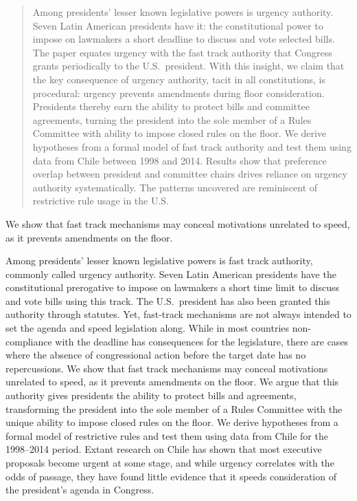 \begin{abstract}
\noindent  Among presidents' lesser known legislative powers is urgency authority. Seven Latin American presidents have it: the constitutional power to impose on lawmakers a short deadline to discuss and vote selected bills. The paper equates urgency with the fast track authority that Congress grants periodically to the U.S.\ president. With this insight, we claim that the key consequence of urgency authority, tacit in all constitutions, is procedural: urgency prevents amendments during floor consideration. Presidents thereby earn the ability to protect bills and committee agreements, turning the president into the sole member of a Rules Committee with ability to impose closed rules on the floor. We derive hypotheses from a formal model of fast track authority and test them using data from Chile between 1998 and 2014. Results show that preference overlap between president and committee chairs drives reliance on urgency authority systematically. The patterns uncovered are reminiscent of restrictive rule usage in the U.S.
\end{abstract}

We show that fast track mechanisms may conceal motivations unrelated to speed, as it prevents amendments on the floor.


\noindent  Among presidents' lesser known legislative powers is fast track authority, commonly called urgency authority. Seven Latin American presidents have the constitutional prerogative to impose on lawmakers a short time limit to discuss and vote bills using this track. The U.S.\ president has also been granted this authority through statutes. Yet, fast-track mechanisms are not always intended to set the agenda and speed legislation along. While in most countries non-compliance with the deadline has consequences for the legislature, there are cases where the absence of congressional action before the target date has no repercussions. We show that fast track mechanisms may conceal motivations unrelated to speed, as it prevents amendments on the floor. We argue that this authority gives presidents the ability to protect bills and agreements, transforming the president into the sole member of a Rules Committee with the unique ability to impose closed rules on the floor.  We derive hypotheses from a formal model of restrictive rules and test them using data from Chile for the 1998--2014 period. Extant research on Chile has shown that most executive proposals become urgent at some stage, and while urgency correlates with the odds of passage, they have found little evidence that it speeds consideration of the president's agenda in Congress.



